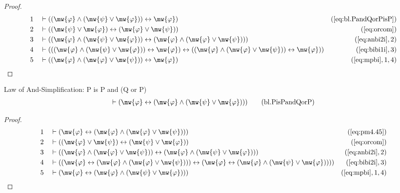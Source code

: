 \begin{proof}
\begin{align}
  1 &&  & \vdash ( ( \mw{\varphi} \wedge ( \mw{\psi} \vee \mw{\varphi} ) )
     \leftrightarrow \mw{\varphi}
     )&(\mbox{\ref{eq:bl.PandQorPisP}})\notag
  \\ 2 &&  & \vdash ( ( \mw{\psi} \vee \mw{\varphi} ) \leftrightarrow (
     \mw{\varphi} \vee \mw{\psi} )
     )&(\mbox{\ref{eq:orcom}})\notag
  \\ 3 &&  & \vdash ( ( \mw{\varphi} \wedge ( \mw{\psi} \vee \mw{\varphi} ) )
     \leftrightarrow ( \mw{\varphi} \wedge ( \mw{\varphi}
     \vee \mw{\psi} ) ) )&(\mbox{\ref{eq:anbi2i}},2)\notag
  \\ 4 &&  & \vdash ( ( ( \mw{\varphi} \wedge ( \mw{\psi} \vee \mw{\varphi} ) )
     \leftrightarrow \mw{\varphi} ) \leftrightarrow ( (
     \mw{\varphi} \wedge ( \mw{\varphi} \vee \mw{\psi} ) )
     \leftrightarrow \mw{\varphi} )
     )&(\mbox{\ref{eq:bibi1i}},3)\notag
  \\ 5 &&  & \vdash ( ( \mw{\varphi} \wedge ( \mw{\varphi} \vee \mw{\psi} ) )
     \leftrightarrow \mw{\varphi}
     )&(\mbox{\ref{eq:mpbi}},1,4)\notag
\end{align}
\end{proof}

\begin{lemma} {Law of And-Simplification: P is P
and (Q or P)}
\begin{align}
\vdash ( \mw{\varphi} \leftrightarrow ( \mw{\varphi} \wedge ( \mw{\psi} \vee
    \mw{\varphi} ) ) )\label{eq:bl.PisPandQorP}\tag{bl.PisPandQorP}
\end{align}
\end{lemma}


\begin{proof}
\begin{align}
  1 &&  & \vdash ( \mw{\varphi} \leftrightarrow ( \mw{\varphi} \wedge (
     \mw{\varphi} \vee \mw{\psi} ) )
     )&(\mbox{\ref{eq:pm4.45}})\notag
  \\ 2 &&  & \vdash ( ( \mw{\varphi} \vee \mw{\psi} ) \leftrightarrow (
     \mw{\psi} \vee \mw{\varphi} )
     )&(\mbox{\ref{eq:orcom}})\notag
  \\ 3 &&  & \vdash ( ( \mw{\varphi} \wedge ( \mw{\varphi} \vee \mw{\psi} ) )
     \leftrightarrow ( \mw{\varphi} \wedge ( \mw{\psi}
     \vee \mw{\varphi} ) )
     )&(\mbox{\ref{eq:anbi2i}},2)\notag
  \\ 4 &&  & \vdash ( ( \mw{\varphi} \leftrightarrow ( \mw{\varphi} \wedge (
     \mw{\varphi} \vee \mw{\psi} ) ) ) \leftrightarrow (
     \mw{\varphi} \leftrightarrow ( \mw{\varphi} \wedge (
     \mw{\psi} \vee \mw{\varphi} ) ) )
     )&(\mbox{\ref{eq:bibi2i}},3)\notag
  \\ 5 &&  & \vdash ( \mw{\varphi} \leftrightarrow ( \mw{\varphi} \wedge (
     \mw{\psi} \vee \mw{\varphi} ) )
     )&(\mbox{\ref{eq:mpbi}},1,4)\notag
\end{align}
\end{proof}

